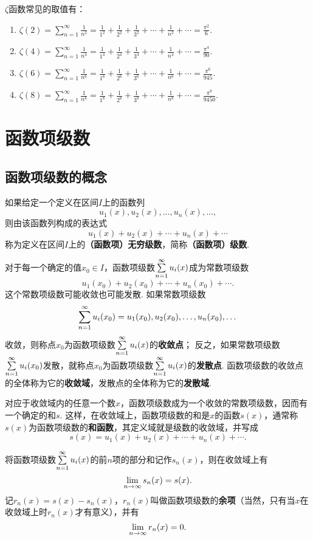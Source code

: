 \begin{property}
\def\zetafunc#1{\zeta(#1) = \sum\limits_{n=1}^{\infty}\frac{1}{n^{#1}} = \frac{1}{1^{#1}}+\frac{1}{2^{#1}}+\frac{1}{3^{#1}}+\dotsb+\frac{1}{n^{#1}}+\dotsb}
\(\zeta\)函数常见的取值有：\begin{enumerate}
\item \(\zetafunc{2} = \frac{\pi^2}{6}\).
\item \(\zetafunc{4} = \frac{\pi^4}{90}\).
\item \(\zetafunc{6} = \frac{\pi^6}{945}\).
\item \(\zetafunc{8} = \frac{\pi^8}{9450}\).
\end{enumerate}
\end{property}

\section{函数项级数}
\subsection{函数项级数的概念}
\begin{definition}\label{definition:无穷级数.实函数项级数的概念}
如果给定一个定义在区间\(I\)上的函数列\[
u_1(x),u_2(x),\dotsc,u_n(x),\dotsc,
\]则由该函数列构成的表达式\[
u_1(x)+u_2(x)+\dotsb+u_n(x)+\dotsb
\]称为定义在区间\(I\)上的\textbf{（函数项）无穷级数}，简称\textbf{（函数项）级数}.

对于每一个确定的值\(x_0 \in I\)，函数项级数\(\sum\limits_{n=1}^{\infty} u_i(x)\)成为常数项级数\[
u_1(x_0)+u_2(x_0)+\dotsb+u_n(x_0)+\dotsb.
\]这个常数项级数可能收敛也可能发散.
如果常数项级数\[
\sum\limits_{n=1}^{\infty} u_i(x_0) = u_1(x_0),u_2(x_0),\dotsc,u_n(x_0),\dotsc
\]收敛，则称点\(x_0\)为函数项级数\(\sum\limits_{n=1}^{\infty} u_i(x)\)的\textbf{收敛点}；
反之，如果常数项级数\(\sum\limits_{n=1}^{\infty} u_i(x_0)\)发散，就称点\(x_0\)为函数项级数\(\sum\limits_{n=1}^{\infty} u_i(x)\)的\textbf{发散点}.
函数项级数的收敛点的全体称为它的\textbf{收敛域}，发散点的全体称为它的\textbf{发散域}.

对应于收敛域内的任意一个数\(x\)，函数项级数成为一个收敛的常数项级数，因而有一个确定的和\(s\).
这样，在收敛域上，函数项级数的和是\(x\)的函数\(s(x)\)，通常称\(s(x)\)为函数项级数的\textbf{和函数}，其定义域就是级数的收敛域，并写成\[
s(x) = u_1(x)+u_2(x)+\dotsb+u_n(x)+\dotsb.
\]

将函数项级数\(\sum\limits_{n=1}^{\infty} u_i(x)\)的前\(n\)项的部分和记作\(s_n(x)\)，则在收敛域上有\[
\lim\limits_{n\to\infty} s_n(x) = s(x).
\]记\(r_n(x) = s(x)-s_n(x)\)，\(r_n(x)\)叫做函数项级数的\textbf{余项}（当然，只有当\(x\)在收敛域上时\(r_n(x)\)才有意义），并有\[
\lim\limits_{n\to\infty} r_n(x) = 0.
\]
\end{definition}

